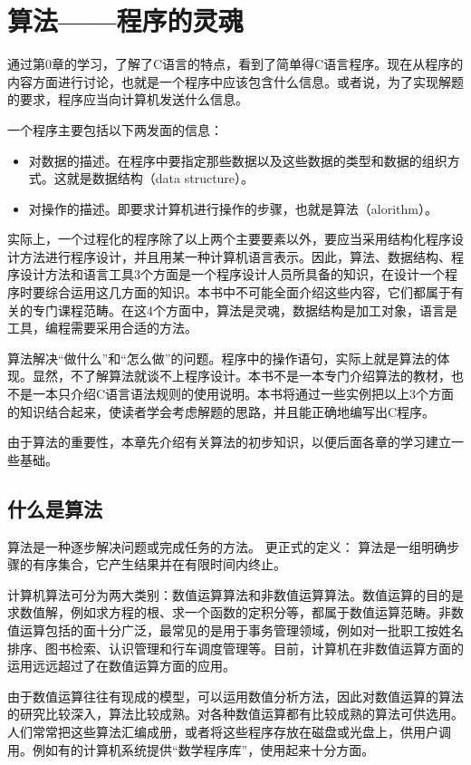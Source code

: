 \chapter{算法——程序的灵魂}

通过第0章的学习，了解了C语言的特点，看到了简单得C语言程序。现在从程序的内容方面进行讨论，也就是一个程序中应该包含什么信息。或者说，为了实现解题的要求，程序应当向计算机发送什么信息。

一个程序主要包括以下两发面的信息：
\begin{itemize}
	\item 对数据的描述。在程序中要指定那些数据以及这些数据的类型和数据的组织方式。这就是数据结构（data structure）。
	\item 对操作的描述。即要求计算机进行操作的步骤，也就是算法（alorithm）。
\end{itemize}

实际上，一个过程化的程序除了以上两个主要要素以外，要应当采用结构化程序设计方法进行程序设计，并且用某一种计算机语言表示。因此，算法、数据结构、程序设计方法和语言工具3个方面是一个程序设计人员所具备的知识，在设计一个程序时要综合运用这几方面的知识。本书中不可能全面介绍这些内容，它们都属于有关的专门课程范畴。在这4个方面中，算法是灵魂，数据结构是加工对象，语言是工具，编程需要采用合适的方法。

算法解决“做什么”和“怎么做”的问题。程序中的操作语句，实际上就是算法的体现。显然，不了解算法就谈不上程序设计。本书不是一本专门介绍算法的教材，也不是一本只介绍C语言语法规则的使用说明。本书将通过一些实例把以上3个方面的知识结合起来，使读者学会考虑解题的思路，并且能正确地编写出C程序。

由于算法的重要性，本章先介绍有关算法的初步知识，以便后面各章的学习建立一些基础。

\section{什么是算法}

算法是一种逐步解决问题或完成任务的方法。
更正式的定义：
算法是一组明确步骤的有序集合，它产生结果并在有限时间内终止。

计算机算法可分为两大类别：数值运算算法和非数值运算算法。数值运算的目的是求数值解，例如求方程的根、求一个函数的定积分等，都属于数值运算范畴。非数值运算包括的面十分广泛，最常见的是用于事务管理领域，例如对一批职工按姓名排序、图书检索、认识管理和行车调度管理等。目前，计算机在非数值运算方面的运用远远超过了在数值运算方面的应用。

由于数值运算往往有现成的模型，可以运用数值分析方法，因此对数值运算的算法的研究比较深入，算法比较成熟。对各种数值运算都有比较成熟的算法可供选用。人们常常把这些算法汇编成册，或者将这些程序存放在磁盘或光盘上，供用户调用。例如有的计算机系统提供“数学程序库”，使用起来十分方面。

